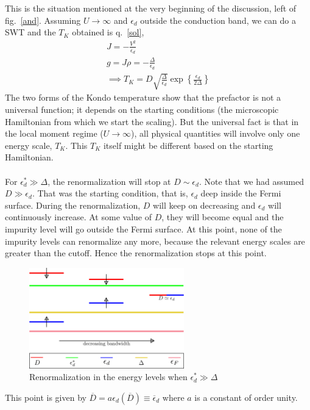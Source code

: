 This is the situation mentioned at the very beginning of the discussion, left of fig.~\ref{and}.
Assuming \(U \rightarrow \infty\) and \(\epsilon_d\) outside the conduction band, we can do a SWT and the \(T_K\) obtained is q.~\ref{sol},
\begin{gather}
    J = -\frac{V^2}{\epsilon_d}\\
    g = J\rho = -\frac{\Delta}{\epsilon_d}\\
    \implies T_K = D\sqrt{\frac{\Delta}{\epsilon_d}}\exp\left\{\frac{\epsilon_d}{2\Delta}\right\}\label{jean2}
\end{gather}
The two forms of the Kondo temperature show that the prefactor is not a universal function; it depends on the starting conditions (the microscopic Hamiltonian from which we start the scaling).
But the universal fact is that in the local moment regime (\(U \rightarrow \infty\)), all physical quantities will involve only one energy scale, \(T_K\).
This \(T_K\) itself might be different based on the starting Hamiltonian.\\\\
For \(\epsilon_d^* \gg \Delta\), the renormalization will stop at \(D \sim \epsilon_d\).
Note that we had assumed \(D \gg \epsilon_d\).
That was the starting condition, that is, \(\epsilon_d\) deep inside the Fermi surface.
During the renormalization, \(D\) will keep on decreasing and \(\epsilon_d\) will continuously increase.
At some value of \(D\), they will become equal and the impurity level will go outside the Fermi surface.
At this point, none of the impurity levels can renormalize any more, because the relevant energy scales are greater than the cutoff.
Hence the renormalization stops at this point.
\begin{figure} 
	\centering 
	\includegraphics[width=0.6\textwidth]{../figures/full.png}
	\caption{Renormalization in the energy levels when \(\epsilon_d^* \gg \Delta\)}
\end{figure}
This point is given by \(\overline D = a\epsilon_d(\overline D) \equiv \overline \epsilon_d\) where \(a\) is a constant of order unity.
